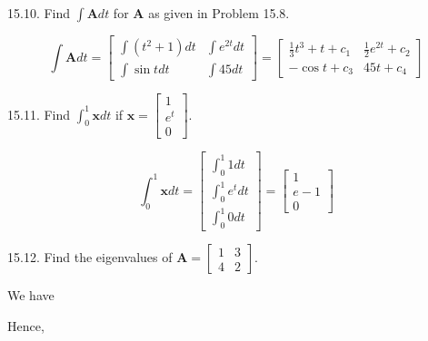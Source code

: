 \documentclass[10pt]{article}
\begin{document}
15.10. Find $\int \mathbf{A} d t$ for $\mathbf{A}$ as given in Problem 15.8.

$$
\int \mathbf{A} d t=\left[\begin{array}{cc}
\int\left(t^{2}+1\right) d t & \int e^{2 t} d t \\
\int \sin t d t & \int 45 d t
\end{array}\right]=\left[\begin{array}{ll}
\frac{1}{3} t^{3}+t+c_{1} & \frac{1}{2} e^{2 t}+c_{2} \\
-\cos t+c_{3} & 45 t+c_{4}
\end{array}\right]
$$

15.11. Find $\int_{0}^{1} \mathbf{x} d t$ if $\mathbf{x}=\left[\begin{array}{c}1 \\ e^{t} \\ 0\end{array}\right]$.

$$
\int_{0}^{1} \mathbf{x} d t=\left[\begin{array}{c}
\int_{0}^{1} 1 d t \\
\int_{0}^{1} e^{t} d t \\
\int_{0}^{1} 0 d t
\end{array}\right]=\left[\begin{array}{c}
1 \\
e-1 \\
0
\end{array}\right]
$$

15.12. Find the eigenvalues of $\mathbf{A}=\left[\begin{array}{ll}1 & 3 \\ 4 & 2\end{array}\right]$.

We have

Hence,
\end{document}
